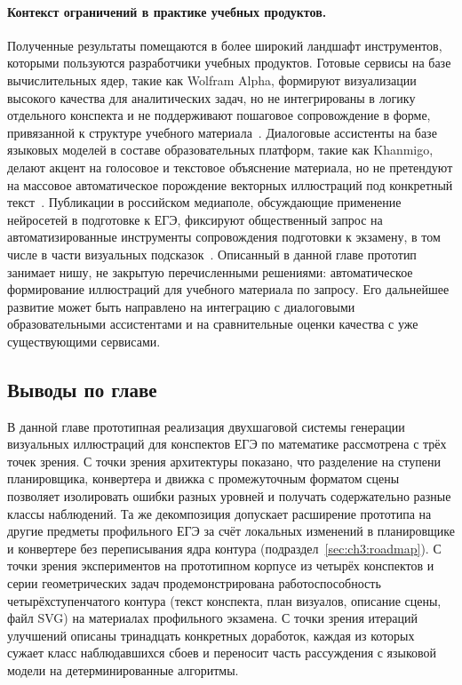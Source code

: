 \paragraph{Контекст ограничений в практике учебных продуктов.} Полученные результаты помещаются в более широкий ландшафт инструментов, которыми пользуются разработчики учебных продуктов. Готовые сервисы на базе вычислительных ядер, такие как Wolfram Alpha, формируют визуализации высокого качества для аналитических задач, но не интегрированы в логику отдельного конспекта и не поддерживают пошаговое сопровождение в форме, привязанной к структуре учебного материала~\cite{WolframAlpha2025}. Диалоговые ассистенты на базе языковых моделей в составе образовательных платформ, такие как Khanmigo, делают акцент на голосовое и текстовое объяснение материала, но не претендуют на массовое автоматическое порождение векторных иллюстраций под конкретный текст~\cite{Khanmigo2025}. Публикации в российском медиаполе, обсуждающие применение нейросетей в подготовке к ЕГЭ, фиксируют общественный запрос на автоматизированные инструменты сопровождения подготовки к экзамену, в том числе в части визуальных подсказок~\cite{RBCTrendsAIEGE2024}. Описанный в данной главе прототип занимает нишу, не закрытую перечисленными решениями: автоматическое формирование иллюстраций для учебного материала по запросу. Его дальнейшее развитие может быть направлено на интеграцию с диалоговыми образовательными ассистентами и на сравнительные оценки качества с уже существующими сервисами.

\subsection{Выводы по главе}
\label{sec:ch3:summary}

В данной главе прототипная реализация двухшаговой системы генерации визуальных иллюстраций для конспектов ЕГЭ по математике рассмотрена с трёх точек зрения. С точки зрения архитектуры показано, что разделение на ступени планировщика, конвертера и движка с промежуточным форматом сцены позволяет изолировать ошибки разных уровней и получать содержательно разные классы наблюдений. Та же декомпозиция допускает расширение прототипа на другие предметы профильного ЕГЭ за счёт локальных изменений в планировщике и конвертере без переписывания ядра контура (подраздел~\ref{sec:ch3:roadmap}). С точки зрения экспериментов на прототипном корпусе из четырёх конспектов и серии геометрических задач продемонстрирована работоспособность четырёхступенчатого контура (текст конспекта, план визуалов, описание сцены, файл SVG) на материалах профильного экзамена. С точки зрения итераций улучшений описаны тринадцать конкретных доработок, каждая из которых сужает класс наблюдавшихся сбоев и переносит часть рассуждения с языковой модели на детерминированные алгоритмы.

